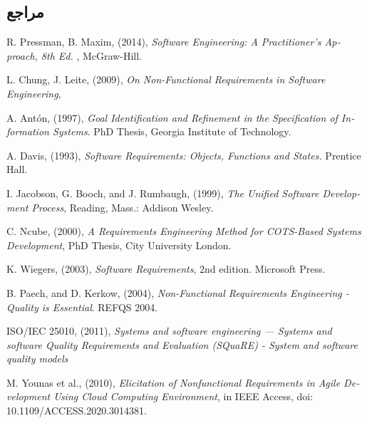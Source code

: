 {\begin{enumerate}[a)]
\begin{center}
\end{center}
\end{enumerate}
	

\subsection*{مراجع}

\begin{latin}
	\begingroup
	\renewcommand{\section}[2]{}%
	
\begin{thebibliography}{9}

	R. Pressman,   B. Maxim, (2014),
	\textit{Software Engineering: A Practitioner’s Approach, 8th Ed. },
	McGraw-Hill.

	
	
	L. Chung,  J. Leite, (2009),
	\textit{On Non-Functional Requirements in Software Engineering},
	
	
	A. Antón, (1997),
	\textit{Goal Identification and Refinement in
	the Specification of Information Systems}. PhD Thesis,
	Georgia Institute of Technology.
	
	A. Davis, (1993), \textit{Software Requirements: Objects, Functions
	and States.} Prentice Hall.

	I. Jacobson, G. Booch, and J. Rumbaugh, (1999), \textit{The
	Unified Software Development Process}, Reading,
	Mass.: Addison Wesley.
	
	C. Ncube, (2000), \textit{A Requirements Engineering Method
	for COTS-Based Systems Development}, PhD Thesis,
	City University London.
	
	
	K. Wiegers, (2003), \textit{Software Requirements}, 2nd edition.
	Microsoft Press.
	
	B. Paech, and D. Kerkow,  (2004), \textit{Non-Functional Requirements Engineering - Quality is Essential}.
	REFQS 2004.


	ISO/IEC 25010, (2011),\textit{ Systems and software engineering — Systems and software Quality Requirements and Evaluation (SQuaRE) - System and software quality models}
	
	M. Younas et al., (2010), \textit{Elicitation of Nonfunctional Requirements in Agile Development Using Cloud Computing Environment}, in IEEE Access, doi: 10.1109/ACCESS.2020.3014381.
	

\end{thebibliography}
\end{latin}}
